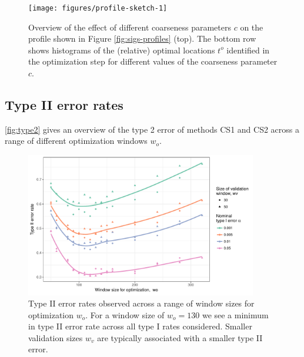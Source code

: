 \documentclass[12pt]{article}
\begin{document}

\begin{figure}

{\centering \texttt{[image: figures/profile-sketch-1]} 

}

\caption{Overview of the effect of different coarseness parameters $c$ on the profile shown in Figure \ref{fig:sigs-profiles} (top). The bottom row shows histograms of  the (relative) optimal locations $t^o$ identified in the optimization step for different values of the coarseness parameter $c$. }\label{fig:profile-sketch}
\end{figure}

\subsection{Type II error rates}\label{type-ii-error-rates}

\autoref{fig:type2} gives an overview of the type 2 error of methods CS1
and CS2 across a range of different optimization windows \(w_o\).

\begin{figure}

{\centering \includegraphics[width=0.9\textwidth]{figures/type2-1} 

}

\caption{Type II error rates observed across a range of window sizes for optimization $w_o$. For a window size of $w_o = 130$ we see a minimum in type II error rate across all type I rates considered. Smaller validation sizes $w_v$ are typically associated with a smaller type II error.}\label{fig:type2}
\end{figure}
\end{document}
